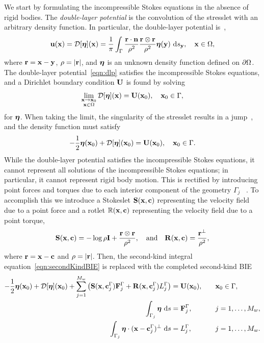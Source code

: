 \documentclass[preprint, 10pt]{elsarticle}
\begin{document}
We start by formulating the incompressible Stokes equations in the
absence of rigid bodies.  The {\em double-layer potential} is the
convolution of the stresslet with an arbitrary density function.  In
particular, the double-layer potential is~\cite{Ladyzhenskaya1963,
Pozrikidis1992},
\begin{align}
  \label{eqn:dlp}
  {\mathbf{u}}({\mathbf{x}}) = {\mathcal{D}}[{\boldsymbol\eta}]({\mathbf{x}}) = \frac{1}{\pi}\int_{\Gamma}
  \frac{{\mathbf{r}}\cdot{\mathbf{n}}}{\rho^2}\frac{{\mathbf{r}} \otimes {\mathbf{r}}}{\rho^2}
  {\boldsymbol\eta}({\mathbf{y}})~\text{d}s_{{\mathbf{y}}}, \quad {\mathbf{x}} \in \Omega,
\end{align}
where ${\mathbf{r}} = {\mathbf{x}} - {\mathbf{y}}$, $\rho=|{\mathbf{r}}|$, and ${\boldsymbol\eta}$ is an unknown density
function defined on ${\partial}\Omega$.  The double-layer
potential~\eqref{eqn:dlp} satisfies the incompressible Stokes equations,
and a Dirichlet boundary condition ${\mathbf{U}}$ is found by solving
\begin{align*}
  \lim_{\substack{{\mathbf{x}} \rightarrow {\mathbf{x}}_0 \\ {\mathbf{x}} \in \Omega}}
    {\mathcal{D}}[{\boldsymbol\eta}]({\mathbf{x}}) = {\mathbf{U}}({\mathbf{x}}_0), \quad {\mathbf{x}}_0 \in \Gamma,
\end{align*}
for ${\boldsymbol\eta}$.  When taking the limit, the
singularity of the stresslet results in a jump~\cite{Pozrikidis1992},
and the density function must satisfy  
\begin{align}
  -\frac{1}{2} {\boldsymbol\eta}({\mathbf{x}}_0) + {\mathcal{D}}[{\boldsymbol\eta}]({\mathbf{x}}_0) = {\mathbf{U}}({\mathbf{x}}_0), 
    \quad {\mathbf{x}}_0 \in \Gamma.
  \label{eqn:secondKindBIE}
\end{align}
While the double-layer potential satisfies the incompressible Stokes
equations, it cannot represent all solutions of the incompressible
Stokes equations; in particular, it cannot represent rigid body motion.
This is rectified by introducing point forces and torques due to
each interior component of the geometry $\Gamma_j$ ~\cite{Power1987, Power1993}.  To accomplish this we introduce a Stokeslet $\mathbf{S}({\mathbf{x}},{\mathbf{c}})$ representing the velocity field due to a point force and a rotlet ${\mathbb{R}}({\mathbf{x}},{\mathbf{c}})$ representing the velocity field due to a point torque,
\begin{align*}
  \mathbf{S}({\mathbf{x}},{\mathbf{c}}) = -\log\rho\mathbf{I} + 
  \frac{{\mathbf{r}} \otimes {\mathbf{r}}}{\rho^2}, \quad \text{and} \quad
  \mathbf{R}({\mathbf{x}},{\mathbf{c}}) = \frac{{\mathbf{r}}^\perp}{\rho^2},
\end{align*}
 where ${\mathbf{r}} = {\mathbf{x}} - {\mathbf{c}}$ and $\rho = |{\mathbf{r}}|$.  Then, the
second-kind integral equation~\eqref{eqn:secondKindBIE} is replaced with
the completed second-kind BIE
\begin{equation}
  \label{eqn:completed_DLP}
  \begin{split}
  -\frac{1}{2}{\boldsymbol\eta}({\mathbf{x}}_0) + {\mathcal{D}}[{\boldsymbol\eta}]({\mathbf{x}}_0) + 
    \sum_{j=1}^{M_w} \left(\mathbf{S}({\mathbf{x}},{\mathbf{c}}^\Gamma_j){\mathbf{F}}^\Gamma_j + 
      \mathbf{R}({\mathbf{x}},{\mathbf{c}}^\Gamma_j)L^\Gamma_j\right) &= {\mathbf{U}}({\mathbf{x}}_0),
      \quad &&{\mathbf{x}}_0 \in \Gamma, \\
  \int_{\Gamma_j} {\boldsymbol\eta}~\text{d}s &= {\mathbf{F}}^\Gamma_j, 
      &&j=1,\ldots,M_w, \\
  \int_{\Gamma_j} {\boldsymbol\eta}\cdot ({\mathbf{x}} - {\mathbf{c}}^\Gamma_j)^\perp~\text{d}s &=   
      L^\Gamma_j, &&j=1,\ldots,M_w.
  \end{split}
\end{equation}
\end{document}
